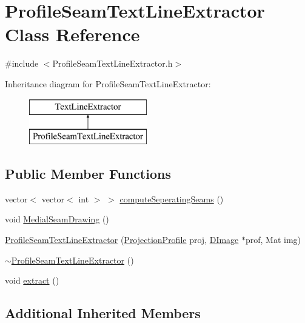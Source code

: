 \hypertarget{class_profile_seam_text_line_extractor}{\section{Profile\+Seam\+Text\+Line\+Extractor Class Reference}
\label{class_profile_seam_text_line_extractor}
}


{\ttfamily \#include $<$Profile\+Seam\+Text\+Line\+Extractor.\+h$>$}

Inheritance diagram for Profile\+Seam\+Text\+Line\+Extractor\+:\begin{figure}[H]
\begin{center}
\leavevmode
\includegraphics[height=2.000000cm]{class_profile_seam_text_line_extractor}
\end{center}
\end{figure}
\subsection*{Public Member Functions}
\begin{DoxyCompactItemize}
\item 
vector$<$ vector$<$ int $>$ $>$ \hyperlink{class_profile_seam_text_line_extractor_a8221b34c948ac11481e2b8c8658ca4c6}{compute\+Seperating\+Seams} ()
\item 
void \hyperlink{class_profile_seam_text_line_extractor_adf05463fd596d059da9669d3f8e43fed}{Medial\+Seam\+Drawing} ()
\item 
\hyperlink{class_profile_seam_text_line_extractor_ab20c9e4368b7f767e14dc96715bb6567}{Profile\+Seam\+Text\+Line\+Extractor} (\hyperlink{class_projection_profile}{Projection\+Profile} proj, \hyperlink{class_d_image}{D\+Image} $\ast$prof, Mat img)
\item 
\hyperlink{class_profile_seam_text_line_extractor_a96e8293704190d08a00afb7fc0127f98}{$\sim$\+Profile\+Seam\+Text\+Line\+Extractor} ()
\item 
void \hyperlink{class_profile_seam_text_line_extractor_a67017476e961c0531524d3f52cf70e23}{extract} ()
\end{DoxyCompactItemize}
\subsection*{Additional Inherited Members}


